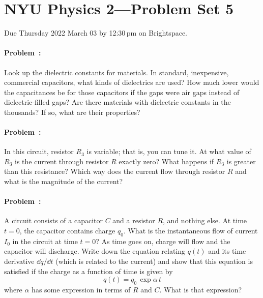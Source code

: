 \documentclass[12pt]{article}
\begin{document}
\section*{NYU Physics 2---Problem Set 5}

Due Thursday 2022 March 03 by 12:30\,pm on Brightspace.

\paragraph{Problem~\theproblem:}%
Look up the dielectric constants for materials.
In standard, inexpensive, commercial capacitors, what kinds of dielectrics are used?
How much lower would the capacitances be for those capacitors if the gaps were air gaps instead
of dielectric-filled gaps?
Are there materials with dielectric constants in the thousands? If so, what are their properties?

\paragraph{Problem~\theproblem:}%
In this circuit, resistor $R_3$ is variable; that is, you can tune it. At what value of $R_3$
is the current through resistor $R$ exactly zero? What happens if $R_3$ is
greater than this resistance? Which way does the current flow through resistor $R$ and what is
the magnitude of the current?

\paragraph{Problem~\theproblem:}%
A circuit consists of a capacitor $C$ and a resistor $R$,
and nothing else.
At time $t=0$, the capacitor contains charge $q_0$.
What is the instantaneous flow of current $I_0$ in the circuit at time $t=0$?
As time goes on, charge will flow and the capacitor will discharge.
Write down the equation relating $q(t)$ and its time derivative $\dd q/\dd t$ (which
is related to the current) and show that this equation is satisfied if the charge
as a function of time is given by
\begin{equation}
q(t) = q_0\,\exp \alpha\,t
\end{equation}
where $\alpha$ has some expression in terms of $R$ and $C$. What is that expression?
\end{document}
